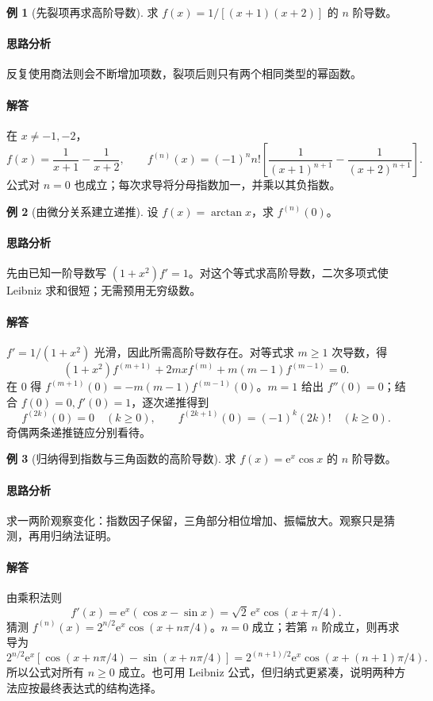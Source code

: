 \documentclass[UTF8,fontset=fandol,12pt,oneside,openany]{ctexrep}
\newcommand{\ee}{\mathrm e}
\theoremstyle{definition}
\newtheorem{example}{例}[chapter]
\begin{document}
\begin{example}[先裂项再求高阶导数]
求 $f(x)=1/[(x+1)(x+2)]$ 的 $n$ 阶导数。
\end{example}
\paragraph{思路分析}反复使用商法则会不断增加项数，裂项后则只有两个相同类型的幂函数。
\paragraph{解答}在 $x\ne-1,-2$，
\[
 f(x)=\frac1{x+1}-\frac1{x+2},\qquad
 f^{(n)}(x)=(-1)^n n!\left[\frac1{(x+1)^{n+1}}-\frac1{(x+2)^{n+1}}\right].
\]
公式对 $n=0$ 也成立；每次求导将分母指数加一，并乘以其负指数。

\begin{example}[由微分关系建立递推]
设 $f(x)=\arctan x$，求 $f^{(n)}(0)$。
\end{example}
\paragraph{思路分析}先由已知一阶导数写 $(1+x^2)f'=1$。对这个等式求高阶导数，二次多项式使 Leibniz 求和很短；无需预用无穷级数。
\paragraph{解答}$f'=1/(1+x^2)$ 光滑，因此所需高阶导数存在。对等式求 $m\ge1$ 次导数，得
\[
 (1+x^2)f^{(m+1)}+2mx f^{(m)}+m(m-1)f^{(m-1)}=0.
\]
在 $0$ 得 $f^{(m+1)}(0)=-m(m-1)f^{(m-1)}(0)$。$m=1$ 给出 $f''(0)=0$；结合 $f(0)=0,f'(0)=1$，逐次递推得到
\[
 f^{(2k)}(0)=0\quad(k\ge0),\qquad
 f^{(2k+1)}(0)=(-1)^k(2k)!\quad(k\ge0).
\]
奇偶两条递推链应分别看待。

\begin{example}[归纳得到指数与三角函数的高阶导数]
求 $f(x)=\ee^x\cos x$ 的 $n$ 阶导数。
\end{example}
\paragraph{思路分析}求一两阶观察变化：指数因子保留，三角部分相位增加、振幅放大。观察只是猜测，再用归纳法证明。
\paragraph{解答}由乘积法则
\[
 f'(x)=\ee^x(\cos x-\sin x)=\sqrt2\,\ee^x\cos(x+\pi/4).
\]
猜测 $f^{(n)}(x)=2^{n/2}\ee^x\cos(x+n\pi/4)$。$n=0$ 成立；若第 $n$ 阶成立，则再求导为
\[
 2^{n/2}\ee^x[\cos(x+n\pi/4)-\sin(x+n\pi/4)]
 =2^{(n+1)/2}\ee^x\cos(x+(n+1)\pi/4).
\]
所以公式对所有 $n\ge0$ 成立。也可用 Leibniz 公式，但归纳式更紧凑，说明两种方法应按最终表达式的结构选择。
\end{document}

